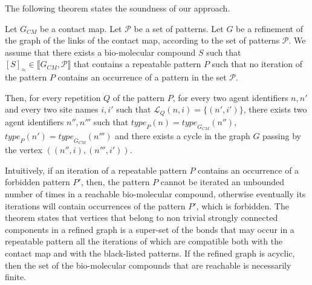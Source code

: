 \documentclass{entcs}
\newcommand{\graphsymb}{G}
\newcommand{\iso}{\approx}
\newcommand{\type}[1][\graphsymb]{\textit{type}_{#1}}
\newcommand{\links}[1][\graphsymb]{\mathcal{L}_{#1}}
\begin{document}
The following theorem states the soundness of our approach.
\begin{theorem}
  \label{th:linkbis}
  Let $\graphsymb_{\textit{CM}}$ be a contact map.
  Let $\mathcal{P}$ be a set of patterns.
  Let $G$ be a refinement of the graph of the links  of the contact map, according to the set of patterns $\mathcal{P}$. We assume that there exists a bio-molecular compound $S$ such that $[S]_{\iso} \in \llbracket \graphsymb_{\textit{CM}}, \mathcal{P}\rrbracket$ that contains a repeatable pattern $P$ such that no iteration of the pattern $P$  contains an occurrence of a pattern in the set $\mathcal{P}$.

  Then, for every repetition $Q$ of the pattern $P$, for every two agent identifiers $n,n'$ and every two site names $i,i'$ such that $\links[Q](n,i)=\{(n',i')\}$, there exists two agent identifiers $n'',n'''$ such that $\type[P](n)=\type[\graphsymb_{\textit{CM}}](n'')$,
  $\type[P](n')=\type[\graphsymb_{\textit{CM}}](n''')$ and
  there exists a cycle in the graph $G$ passing by  the vertex $((n'',i),(n''',i'))$.
\end{theorem}

Intuitively, if an iteration of a repeatable pattern $P$ contains an occurrence of a forbidden pattern $P'$, then, the pattern $P$ cannot be iterated an unbounded number of times in a reachable bio-molecular compound, otherwise eventually its iterations will contain occurrences of the pattern $P'$, which is forbidden. The theorem states that vertices that belong to non trivial strongly connected components in a refined graph
is a super-set of the bonds that may occur in a repeatable pattern all the iterations of which are compatible both with the contact map and with the black-listed patterns. If the refined graph is acyclic, then
the set of the bio-molecular compounds that are reachable is necessarily finite.
\end{document}
